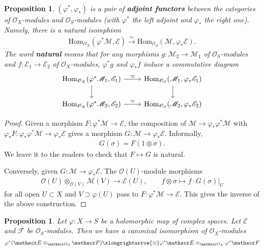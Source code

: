 \documentclass[12pt,b5paper,notitlepage]{report}
\theoremstyle{definition}
\theoremstyle{plain}
\newtheorem{pp}[df]{Proposition}
\newcommand{\Hom}{\mathrm{Hom}}
\newcommand{\scr}{\mathscr}
\numberwithin{equation}{section}
\begin{document}
\begin{pp}\label{lb337}
$(\varphi^*,\varphi_*)$ is a pair of \textbf{adjoint functors} between the categories of $\scr O_X$-modules and $\scr O_S$-modules  (with $\varphi^*$ the left adjoint and $\varphi_*$ the right one). Namely, there is a natural isomphism
\begin{align}
\Hom_{\scr O_X}(\varphi^*\scr M,\scr E)\xrightarrow{\simeq}\Hom_{\scr O_S}(\scr M,\varphi_*\scr E).
\end{align}
The word \textbf{natural}  means that for any morphisms $g:\scr M_2\rightarrow\scr M_1$ of $\scr O_S$-modules and $f:\scr E_1\rightarrow\scr E_2$ of $\scr O_X$-modules, $\varphi^*g$ and $\varphi_*f$ induce a commutative diagram
\begin{equation}
\begin{tikzcd}
\Hom_{\scr O_X}(\varphi^*\scr M_1,\scr E_1) \arrow[d] \arrow[r,"\simeq"] & \Hom_{\scr O_S}(\scr M_1,\varphi_*\scr E_1) \arrow[d] \\
\Hom_{\scr O_X}(\varphi^*\scr M_2,\scr E_2) \arrow[r,"\simeq"]           & \Hom_{\scr O_S}(\scr M_2,\varphi_*\scr E_2)          
\end{tikzcd}
\end{equation}
\end{pp}

\begin{proof}
Given a morphism $F:\varphi^*\scr M\rightarrow\scr E$, the composition of $\scr M\rightarrow\varphi_*\varphi^*\scr M$ with $\varphi_*F:\varphi_*\varphi^*\scr M\rightarrow\varphi_*\scr E$ gives a morphism $G:\scr M\rightarrow\varphi_*\scr E$. Informally,
\begin{align}
G(\sigma)=F(1\otimes\sigma).
\end{align}
We leave it to the readers to check that $F\mapsto G$ is natural.

Conversely, given $G:\scr M\rightarrow\varphi_*\scr E$. The $\scr O(U)$-module morphisms
\begin{gather*}
\scr O(U)\otimes_{\scr O(V)}\scr M(V)\rightarrow\scr E(U),\qquad f\otimes\sigma\mapsto f\cdot G(\sigma)|_U
\end{gather*}
for all open $U\subset X$ and $V\supset \varphi(U)$ pass to $F:\varphi^*\scr M\rightarrow\scr E$. This gives the inverse of the above construction.
\end{proof}

\begin{pp}\label{lb415}
Let $\varphi:X\rightarrow S$ be a holomorphic map of complex spaces. Let $\scr E$ and $\scr F$ be $\scr O_S$-modules. Then we have a canonical isomorphism of $\scr O_X$-modules
\begin{align}\label{eq221}
\varphi^*(\scr E\otimes_{\scr O_S}\scr F)\xlongrightarrow{\simeq}\varphi^*\scr E\otimes_{\scr O_X}\varphi^*\scr F
\end{align}
\end{pp}
\end{document}
